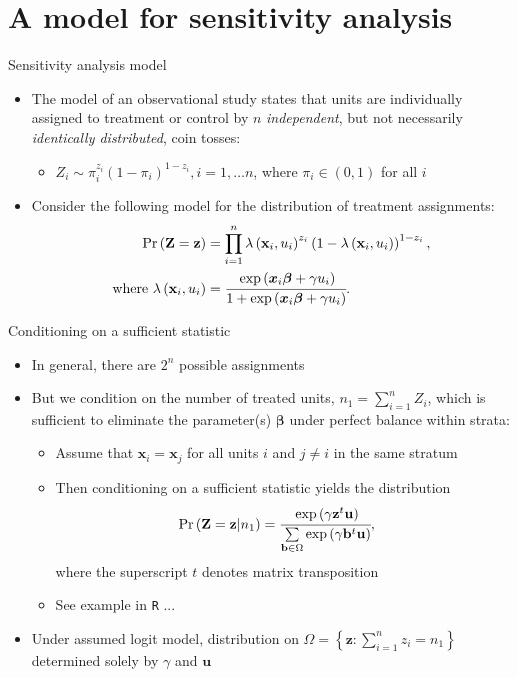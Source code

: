 \documentclass[table, xcolor={dvipsnames}, 9pt]{beamer}
\theoremstyle{newstyle}
\begin{document}
\section{A model for sensitivity analysis}
\begin{frame}{Sensitivity analysis model}
\begin{itemize}
\item The model of an observational study states that units are individually assigned to treatment or control by $n$ \textit{independent}, but not necessarily \textit{identically distributed}, coin tosses: \pause
\begin{itemize}
\item $Z_i \sim \pi_i^{z_i} \left(1 - \pi_i\right)^{1 - z_i}, i = 1, \dots n$, where $\pi_i \in (0, 1)$ for all $i$
\end{itemize}
\item \pause Consider the following model for the distribution of treatment assignments: \pause
\begin{align*} 
\Pr\left(\mathbf{Z} = \mathbf{z}\right) & = \prod \limits_{i = 1}^n \lambda\left(\mathbf{x}_i, u_i\right)^{z_i} \left(1 - \lambda\left(\mathbf{x}_i, u_i\right)\right)^{1 - z_i}, \\
\text{where } \lambda\left(\mathbf{x}_i, u_i\right) & = \cfrac{\exp\left(\bm{x}_i\bm{\beta} + \gamma u_i\right)}{1 + \exp\left(\bm{x}_i\bm{\beta} + \gamma u_i\right)}.
\end{align*}
\end{itemize}
\end{frame}
\begin{frame}{Conditioning on a sufficient statistic}
\begin{itemize}
\item In general, there are $2^n$ possible assignments
\item \pause But we condition on the number of treated units, $n_1 = \sum \limits_{i = 1}^n Z_i$, which is sufficient to eliminate the parameter(s) $\bm{\beta}$ under perfect balance within strata:
\begin{itemize}
\item \pause Assume that $\bm{x}_i = \bm{x}_j$ for all units $i$ and $j \neq i$ in the same stratum
\item \pause Then conditioning on a sufficient statistic yields the distribution
\begin{align*}
\Pr\left(\mathbf{Z} = \mathbf{z} | n_1\right) & = \cfrac{\exp\left(\gamma \mathbf{z}^t\mathbf{u}\right)}{\sum \limits_{\mathbf{b} \in \Omega}\exp\left(\gamma \mathbf{b}^t\mathbf{u}\right)},
\end{align*}
where the superscript $t$ denotes matrix transposition
\item \pause See example in \texttt{R} ...
\end{itemize}
\item \pause Under assumed logit model, distribution on $\Omega = \left\{\bm{z}: \sum_{i = 1}^n z_i = n_1\right\}$ determined solely by $\gamma$ and $\mathbf{u}$
\end{itemize}
\end{frame}
\end{document}
